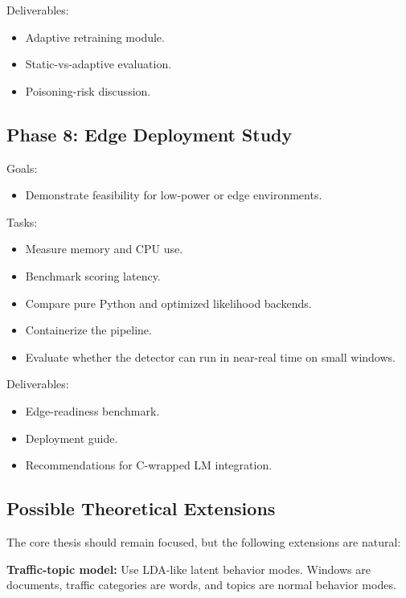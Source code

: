 \documentclass[11pt,a4paper]{article}
\begin{document}
Deliverables:

\begin{itemize}
  \item Adaptive retraining module.
  \item Static-vs-adaptive evaluation.
  \item Poisoning-risk discussion.
\end{itemize}

\subsection{Phase 8: Edge Deployment Study}

Goals:

\begin{itemize}
  \item Demonstrate feasibility for low-power or edge environments.
\end{itemize}

Tasks:

\begin{itemize}
  \item Measure memory and CPU use.
  \item Benchmark scoring latency.
  \item Compare pure Python and optimized likelihood backends.
  \item Containerize the pipeline.
  \item Evaluate whether the detector can run in near-real time on small windows.
\end{itemize}

Deliverables:

\begin{itemize}
  \item Edge-readiness benchmark.
  \item Deployment guide.
  \item Recommendations for C-wrapped LM integration.
\end{itemize}

\subsection{Possible Theoretical Extensions}

The core thesis should remain focused, but the following extensions are natural:

\textbf{Traffic-topic model:} Use LDA-like latent behavior modes. Windows are documents, traffic categories are words, and topics are normal behavior modes.
\end{document}
